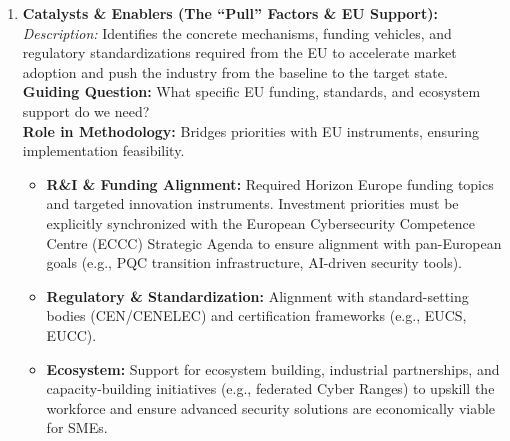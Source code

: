 \documentclass{ieeeaccess}
\begin{document}
\begin{enumerate}
    \item \textbf{Catalysts \& Enablers (The ``Pull'' Factors \& EU Support):}\\
    \textit{Description:} Identifies the concrete mechanisms, funding vehicles, and regulatory standardizations required from the EU to accelerate market adoption and push the industry from the baseline to the target state.\\
    \textbf{Guiding Question:} What specific EU funding, standards, and ecosystem support do we need?\\
    \textbf{Role in Methodology:} Bridges priorities with EU instruments, ensuring implementation feasibility.
    \begin{itemize}
        \item \textbf{R\&I \& Funding Alignment:} Required Horizon Europe funding topics and targeted innovation instruments. Investment priorities must be explicitly synchronized with the European Cybersecurity Competence Centre (ECCC) Strategic Agenda \cite{eccc} to ensure alignment with pan-European goals (e.g., PQC transition infrastructure, AI-driven security tools).
        \item \textbf{Regulatory \& Standardization:} Alignment with standard-setting bodies (CEN/CENELEC) and certification frameworks (e.g., EUCS, EUCC).
        \item \textbf{Ecosystem:} Support for ecosystem building, industrial partnerships, and capacity-building initiatives (e.g., federated Cyber Ranges) to upskill the workforce and ensure advanced security solutions are economically viable for SMEs.
    \end{itemize}


\end{enumerate}
\end{document}
